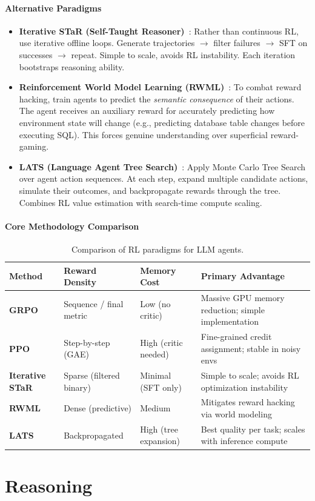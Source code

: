 \subsection{Alternative Paradigms}
\label{alternative-paradigms}

\begin{itemize}
  \item \textbf{Iterative STaR (Self-Taught Reasoner)}~\cite{zelikman2022star}: Rather than continuous RL, use iterative offline loops. Generate trajectories $\rightarrow$ filter failures $\rightarrow$ SFT on successes $\rightarrow$ repeat. Simple to scale, avoids RL instability. Each iteration bootstraps reasoning ability.
  \item \textbf{Reinforcement World Model Learning (RWML)}~\cite{yu2026rwml}: To combat reward hacking, train agents to predict the \emph{semantic consequence} of their actions. The agent receives an auxiliary reward for accurately predicting how environment state will change (e.g., predicting database table changes before executing SQL). This forces genuine understanding over superficial reward-gaming.
  \item \textbf{LATS (Language Agent Tree Search)}~\cite{zhou2024lats}: Apply Monte Carlo Tree Search over agent action sequences. At each step, expand multiple candidate actions, simulate their outcomes, and backpropagate rewards through the tree. Combines RL value estimation with search-time compute scaling.
\end{itemize}

\subsection{Core Methodology Comparison}
\label{core-methodology-comparison}

\begin{table}[ht!]
\centering
\caption{Comparison of RL paradigms for LLM agents.}
\begin{tabular}{@{}lp{3.5cm}p{3.5cm}p{6cm}@{}}
\toprule
\textbf{Method} & \textbf{Reward Density} & \textbf{Memory Cost} & \textbf{Primary Advantage} \\
\midrule
\textbf{GRPO}~\cite{shao2024deepseekmath} & Sequence / final metric & Low (no critic) & Massive GPU memory reduction; simple implementation \\
\textbf{PPO}~\cite{schulman2017proximal} & Step-by-step (GAE) & High (critic needed) & Fine-grained credit assignment; stable in noisy envs \\
\textbf{Iterative STaR}~\cite{zelikman2022star} & Sparse (filtered binary) & Minimal (SFT only) & Simple to scale; avoids RL optimization instability \\
\textbf{RWML}~\cite{yu2026rwml} & Dense (predictive) & Medium & Mitigates reward hacking via world modeling \\
\textbf{LATS}~\cite{zhou2024lats} & Backpropagated & High (tree expansion) & Best quality per task; scales with inference compute \\
\bottomrule
\end{tabular}
\end{table}

\part{Reasoning}

